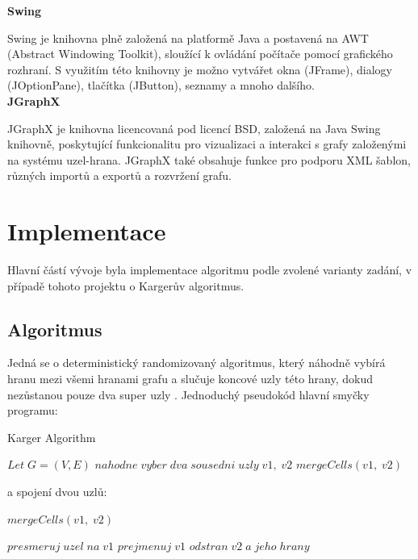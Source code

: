 \documentclass[../projekt.tex]{subfiles}
\begin{document}
\noindent\textbf{Swing} 

Swing \cite{swing} je knihovna plně založená na platformě Java a postavená na AWT (Abstract Windowing Toolkit), sloužící k ovládání počítače pomocí grafického rozhraní. S využitím této knihovny je možno vytvářet okna (JFrame), dialogy (JOptionPane), tlačítka (JButton), seznamy  a mnoho dalšího. \\


\noindent\textbf{JGraphX} 

JGraphX \cite{jgraphx} je knihovna licencovaná pod licencí BSD, založená na Java Swing knihovně, poskytující funkcionalitu pro vizualizaci a interakci s grafy založenými na systému uzel-hrana. JGraphX také obsahuje funkce pro podporu XML šablon, různých importů a exportů a rozvržení grafu.






\section{Implementace}

Hlavní částí vývoje byla implementace algoritmu podle zvolené varianty zadání, v případě tohoto projektu o Kargerův algoritmus. 

\subsection{Algoritmus}

Jedná se o deterministický randomizovaný algoritmus, který náhodně vybírá hranu mezi všemi hranami grafu a slučuje koncové uzly této hrany, dokud nezůstanou pouze dva super uzly \cite{karger}. Jednoduchý pseudokód hlavní smyčky programu: \\ 


\begin{algorithm}
\caption{Karger Algorithm}\label{euclid}
\begin{algorithmic}[1]
\State $Let \; G = (V, E)$
\State $nahodne \; vyber \; dva \; sousedni \; uzly \; v1, \; v2$
\State $mergeCells(v1, \; v2)$
\EndWhile
\end{algorithmic}
\end{algorithm}

\noindent a spojení dvou uzlů: \\

\begin{algorithm}
\caption{$mergeCells(v1,\; v2)$}\label{euclid}
\begin{algorithmic}[1]
\State $presmeruj \; uzel \; na \; v1$ 
\EndFor
\State $prejmenuj \; v1$ 
\State $odstran \; v2 \; a \; jeho \; hrany$ 

\end{algorithmic}
\end{algorithm}
\end{document}

